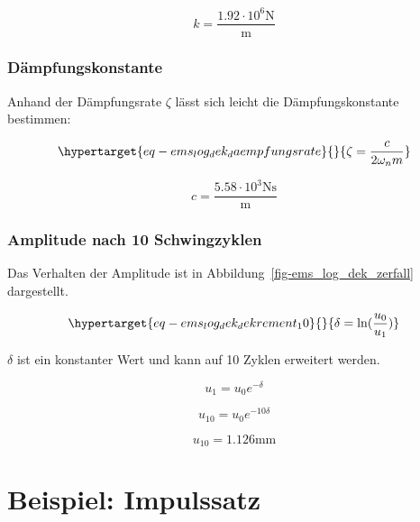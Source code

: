 \documentclass[
  letterpaper,
  DIV=11]{scrreprt}
\begin{document}
\begin{equation}k = \frac{1.92 \cdot 10^{6} \text{N}}{\text{m}}\end{equation}

\hypertarget{duxe4mpfungskonstante}{%
\subsection{Dämpfungskonstante}\label{duxe4mpfungskonstante}}

Anhand der Dämpfungsrate \(\zeta\) lässt sich leicht die
Dämpfungskonstante bestimmen:

\begin{equation}\protect\hypertarget{eq-ems_log_dek_daempfungsrate}{}{
\zeta = \frac{c}{2\omega_nm}
}\label{eq-ems_log_dek_daempfungsrate}\end{equation}

\begin{equation}c = \frac{5.58 \cdot 10^{3} \text{N} \text{s}}{\text{m}}\end{equation}

\hypertarget{amplitude-nach-10-schwingzyklen}{%
\subsection{Amplitude nach 10
Schwingzyklen}\label{amplitude-nach-10-schwingzyklen}}

Das Verhalten der Amplitude ist in
Abbildung~\ref{fig-ems_log_dek_zerfall} dargestellt.

\begin{equation}\protect\hypertarget{eq-ems_log_dek_dekrement_10}{}{
\delta = \ln({\frac{u_0}{u_1}})
}\label{eq-ems_log_dek_dekrement_10}\end{equation}

\(\delta\) ist ein konstanter Wert und kann auf 10 Zyklen erweitert
werden.

\begin{equation}u_{1} = u_{0} e^{- \delta}\end{equation}

\begin{equation}u_{10} = u_{0} e^{- 10 \delta}\end{equation}

\begin{equation}u_{10} = 1.126 \text{mm}\end{equation}

\hypertarget{beispiel-impulssatz}{%
\chapter{Beispiel: Impulssatz}\label{beispiel-impulssatz}}
\end{document}
